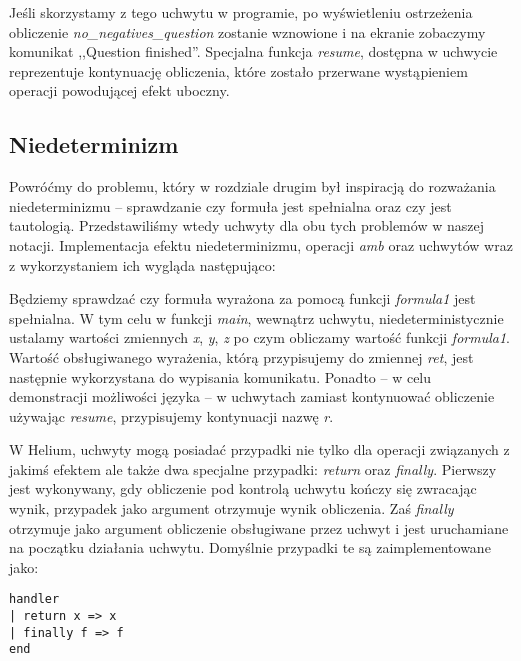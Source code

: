

Jeśli skorzystamy z tego uchwytu w programie, po wyświetleniu ostrzeżenia obliczenie \textit{no\_negatives\_question} zostanie wznowione i na ekranie zobaczymy komunikat ,,Question finished''. Specjalna funkcja \textit{resume}, dostępna w uchwycie reprezentuje kontynuację obliczenia, które zostało przerwane wystąpieniem operacji powodującej efekt uboczny.

\subsection{Niedeterminizm}

Powróćmy do problemu, który w rozdziale drugim był inspiracją do rozważania niedeterminizmu -- sprawdzanie czy formuła jest spełnialna oraz czy jest tautologią. Przedstawiliśmy wtedy uchwyty dla obu tych problemów w naszej notacji. Implementacja efektu niedeterminizmu, operacji \textit{amb} oraz uchwytów wraz z wykorzystaniem ich wygląda następująco:



Będziemy sprawdzać czy formuła wyrażona za pomocą funkcji \textit{formula1} jest spełnialna. W tym celu w funkcji \textit{main}, wewnątrz uchwytu, niedeterministycznie ustalamy wartości zmiennych \textit{x}, \textit{y}, \textit{z} po czym obliczamy wartość funkcji \textit{formula1}. Wartość obsługiwanego wyrażenia, którą przypisujemy do zmiennej \textit{ret}, jest następnie wykorzystana do wypisania komunikatu. Ponadto -- w celu demonstracji możliwości języka -- w uchwytach zamiast kontynuować obliczenie używając \textit{resume}, przypisujemy kontynuacji nazwę \textit{r}.

W Helium, uchwyty mogą posiadać przypadki nie tylko dla operacji związanych z jakimś efektem ale także dwa specjalne przypadki: \textit{return} oraz \textit{finally}. Pierwszy jest wykonywany, gdy obliczenie pod kontrolą uchwytu kończy się zwracając wynik, przypadek jako argument otrzymuje wynik obliczenia. Zaś \textit{finally} otrzymuje jako argument obliczenie obsługiwane przez uchwyt i jest uruchamiane na początku działania uchwytu. Domyślnie przypadki te są zaimplementowane jako:

\begin{lstlisting}
handler
| return x => x
| finally f => f
end
\end{lstlisting}

